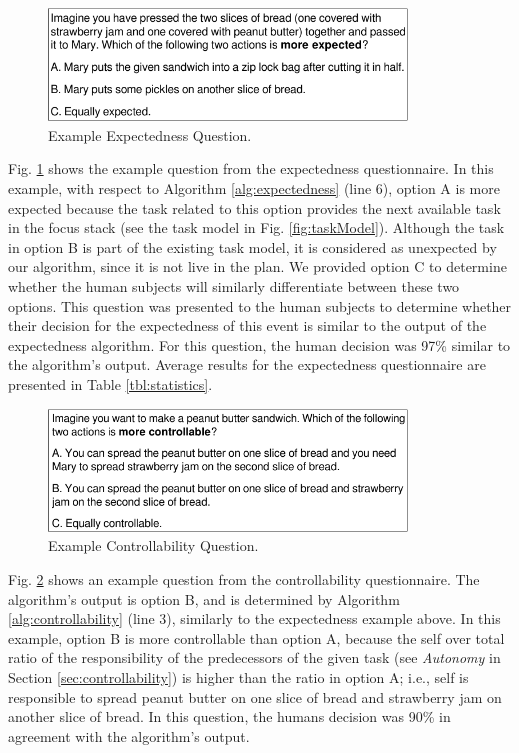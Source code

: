 \documentclass[12pt]{report}
\begin{document}
\begin{figure}[tbh]
  \centering
  \includegraphics[width=0.85\textwidth]{figure/question-sample-croped.pdf}
  \caption{{\fontsize{9}{9}\selectfont Example Expectedness Question.}}
  \label{fig:qs1}
  \vspace{-5mm}
\end{figure}

Fig. \ref{fig:qs1} shows the example question from the expectedness
questionnaire. In this example, with respect to Algorithm
\ref{alg:expectedness} (line 6), option A is more expected because the task
related to this option provides the next available task in the focus stack (see
the task model in Fig. \ref{fig:taskModel}). Although the task in option B is
part of the existing task model, it is considered as unexpected by our
algorithm, since it is not live in the plan. We provided option C to determine
whether the human subjects will similarly differentiate between these two
options. This question was presented to the human subjects to determine whether
their decision for the expectedness of this event is similar to the output of
the expectedness algorithm. For this question, the human decision was 97\%
similar to the algorithm's output. Average results for the expectedness
questionnaire are presented in Table \ref{tbl:statistics}.

\begin{figure}[tbh]
  \centering
  \includegraphics[width=0.85\textwidth]{figure/question-sample2-croped.pdf}
  \caption{{\fontsize{9}{9}\selectfont Example Controllability Question.}}
  \label{fig:qs2}
  \vspace{-5mm}
\end{figure}

Fig. \ref{fig:qs2} shows an example question from the controllability
questionnaire. The algorithm's output is option B, and is determined by
Algorithm \ref{alg:controllability} (line 3), similarly to the expectedness
example above. In this example, option B is more controllable than option A,
because the self over total ratio of the responsibility of the predecessors of
the given task (see \textit{Autonomy} in Section \ref{sec:controllability}) is
higher than the ratio in option A; i.e., self is responsible to spread peanut
butter on one slice of bread and strawberry jam on another slice of bread. In
this question, the humans decision was 90\% in agreement with the algorithm's
output.
\end{document}
